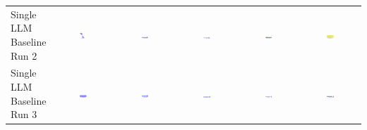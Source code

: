 \begin{table}
\begin{tabular}{@{}lccccc@{}}
    \makecell{Single LLM \\ Baseline \\ Run 2} & \includegraphics[width=0.13\textwidth]{./run_2/png/gpt-4o_results/Arrow.png} & \includegraphics[width=0.13\textwidth]{./run_2/png/o1-preview_results/Arrow.png} & \includegraphics[width=0.13\textwidth]{./run_2/png/claude-3-5-sonnet-20240620_results/Arrow.png} & \includegraphics[width=0.13\textwidth]{./run_2/png/watsonx_meta-llama_llama-3-1-70b-instruct_results/Arrow.png} & \includegraphics[width=0.13\textwidth]{./run_2/png/watsonx_meta-llama_llama-3-405b-instruct_results/Arrow.png} \\
    \makecell{Single LLM \\ Baseline \\ Run 3} & \includegraphics[width=0.13\textwidth]{./run_3/png/gpt-4o_results/Arrow.png} & \includegraphics[width=0.13\textwidth]{./run_3/png/o1-preview_results/Arrow.png} & \includegraphics[width=0.13\textwidth]{./run_3/png/claude-3-5-sonnet-20240620_results/Arrow.png} & \includegraphics[width=0.13\textwidth]{./run_3/png/watsonx_meta-llama_llama-3-1-70b-instruct_results/Arrow.png} & \includegraphics[width=0.13\textwidth]{./run_3/png/watsonx_meta-llama_llama-3-405b-instruct_results/Arrow.png} \\

\end{tabular}
\end{table}

